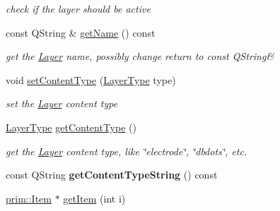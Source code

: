 \begin{DoxyCompactItemize}
\begin{DoxyCompactList}\small\item\em check if the layer should be active \end{DoxyCompactList}\item 
const Q\+String \& \hyperlink{classprim_1_1Layer_aba036a8f047a91e7629f81130bbcb7bb}{get\+Name} () const \hypertarget{classprim_1_1Layer_aba036a8f047a91e7629f81130bbcb7bb}{}\label{classprim_1_1Layer_aba036a8f047a91e7629f81130bbcb7bb}

\begin{DoxyCompactList}\small\item\em get the \hyperlink{classprim_1_1Layer}{Layer} name, possibly change return to const Q\+String\& \end{DoxyCompactList}\item 
void \hyperlink{classprim_1_1Layer_a477672eee633e7a908abdc3648905d74}{set\+Content\+Type} (\hyperlink{classprim_1_1Layer_a9a9c22ae767c4671a07293b69c540547}{Layer\+Type} type)\hypertarget{classprim_1_1Layer_a477672eee633e7a908abdc3648905d74}{}\label{classprim_1_1Layer_a477672eee633e7a908abdc3648905d74}

\begin{DoxyCompactList}\small\item\em set the \hyperlink{classprim_1_1Layer}{Layer} content type \end{DoxyCompactList}\item 
\hyperlink{classprim_1_1Layer_a9a9c22ae767c4671a07293b69c540547}{Layer\+Type} \hyperlink{classprim_1_1Layer_af009cb8e716255926c14abea588a8362}{get\+Content\+Type} ()\hypertarget{classprim_1_1Layer_af009cb8e716255926c14abea588a8362}{}\label{classprim_1_1Layer_af009cb8e716255926c14abea588a8362}

\begin{DoxyCompactList}\small\item\em get the \hyperlink{classprim_1_1Layer}{Layer} content type, like \char`\"{}electrode\char`\"{}, \char`\"{}dbdots\char`\"{}, etc. \end{DoxyCompactList}\item 
const Q\+String {\bfseries get\+Content\+Type\+String} () const \hypertarget{classprim_1_1Layer_aa98e5ea74d0d956e06f71ab07c15903a}{}\label{classprim_1_1Layer_aa98e5ea74d0d956e06f71ab07c15903a}

\item 
\hyperlink{classprim_1_1Item}{prim\+::\+Item} $\ast$ \hyperlink{classprim_1_1Layer_a1d2ef0cb4f5607b1768f9b23bad42d24}{get\+Item} (int i)\hypertarget{classprim_1_1Layer_a1d2ef0cb4f5607b1768f9b23bad42d24}{}\label{classprim_1_1Layer_a1d2ef0cb4f5607b1768f9b23bad42d24}


\end{DoxyCompactItemize}
